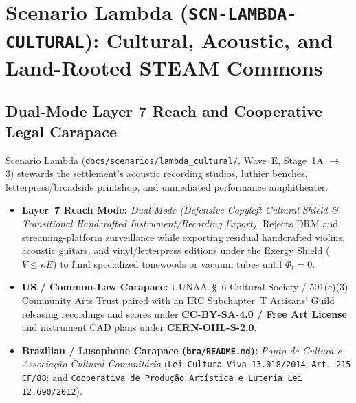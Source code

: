 \chapter{Scenario Lambda (\texttt{SCN-LAMBDA-CULTURAL}): Cultural, Acoustic, and Land-Rooted STEAM Commons}
\label{app:scenario-lambda}

\section{Dual-Mode Layer 7 Reach and Cooperative Legal Carapace}
Scenario Lambda (\texttt{docs/scenarios/lambda\_cultural/}, Wave~E, Stage~1A $\to$ 3) stewards the settlement's acoustic recording studios, luthier benches, letterpress/broadside printshop, and unmediated performance amphitheater.
\begin{itemize}
    \item \textbf{Layer~7 Reach Mode:} \textit{Dual-Mode (Defensive Copyleft Cultural Shield \& Transitional Handcrafted Instrument/Recording Export)}. Rejects DRM and streaming-platform surveillance while exporting residual handcrafted violins, acoustic guitars, and vinyl/letterpress editions under the Exergy Shield ($V \le \kappa E$) to fund specialized tonewoods or vacuum tubes until $\Phi_t = 0$.
    \item \textbf{US / Common-Law Carapace:} UUNAA~\S~6 Cultural Society / 501(c)(3) Community Arts Trust paired with an IRC Subchapter~T Artisans' Guild releasing recordings and scores under \textbf{CC-BY-SA-4.0 / Free Art License} and instrument CAD plans under \textbf{CERN-OHL-S-2.0}.
    \item \textbf{Brazilian / Lusophone Carapace (\texttt{bra/README.md}):} \textit{Ponto de Cultura e Associa{\c{c}}{\~a}o Cultural Comunit{\'a}ria} (\texttt{Lei Cultura Viva 13.018/2014}; \texttt{Art.~215 CF/88}; and \texttt{Cooperativa de Produ{\c{c}}{\~a}o Art{\'\i}stica e Luteria Lei 12.690/2012}).
\end{itemize}

